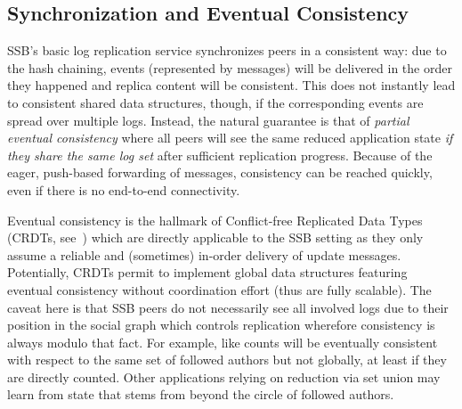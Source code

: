 \documentclass[9pt,sigconf]{acmart}
\begin{document}

\subsection{Synchronization and Eventual Consistency}
\label{Section:Tangle}

SSB's basic log replication service synchronizes peers in a consistent
way: due to the hash chaining, events (represented by messages)
will be delivered in the order they happened and replica content will
be consistent. This does not instantly lead to consistent shared data
structures, though, if the corresponding events are spread over
multiple logs. Instead, the natural guarantee is that of {\em partial eventual
consistency} where all peers will see the same reduced application
state {\em if they share the same log set} after sufficient replication
progress. Because of the eager, push-based forwarding of messages, consistency
can be reached quickly, even if there is no end-to-end connectivity.

Eventual consistency is the hallmark of Conflict-free Replicated Data
Types (CRDTs, see~\cite{shapiro2011conflict}) which are directly applicable to the SSB
setting as they only assume a reliable and (sometimes) in-order
delivery of update messages. Potentially, CRDTs permit to implement
global data structures featuring eventual consistency without
coordination effort (thus are fully scalable). The caveat here is that
SSB peers do not necessarily see all involved logs due to their
position in the social graph which controls replication wherefore
consistency is always modulo that fact. For example, like counts will
be eventually consistent with respect to the same set of followed
authors but not globally, at least if they are directly counted. Other
applications relying on reduction via set union may learn from state
that stems from beyond the circle of followed authors.
\end{document}
